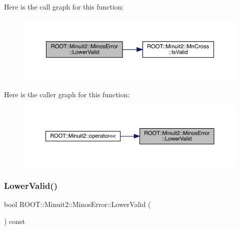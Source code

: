 Here is the call graph for this function\+:
\nopagebreak
\begin{figure}[H]
\begin{center}
\leavevmode
\includegraphics[width=350pt]{d2/dd1/classROOT_1_1Minuit2_1_1MinosError_a4b8c37c90bb53d98d3b4364a5ebc2228_cgraph}
\end{center}
\end{figure}
Here is the caller graph for this function\+:\nopagebreak
\begin{figure}[H]
\begin{center}
\leavevmode
\includegraphics[width=350pt]{d2/dd1/classROOT_1_1Minuit2_1_1MinosError_a4b8c37c90bb53d98d3b4364a5ebc2228_icgraph}
\end{center}
\end{figure}
\mbox{\label{classROOT_1_1Minuit2_1_1MinosError_a4b8c37c90bb53d98d3b4364a5ebc2228}} 
\subsubsection{\texorpdfstring{LowerValid()}{LowerValid()}\hspace{0.1cm}{\footnotesize\ttfamily [2/2]}}
{\footnotesize\ttfamily bool R\+O\+O\+T\+::\+Minuit2\+::\+Minos\+Error\+::\+Lower\+Valid (\begin{DoxyParamCaption}{ }\end{DoxyParamCaption}) const\hspace{0.3cm}{\ttfamily [inline]}}

